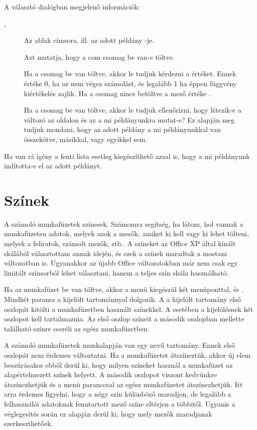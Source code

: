 A választó dialógban megjelenő információk:
\begin{description}
\item[, ] Az  ablak címsora, ill. az
adott  példány -je. 
\item[] Azt mutatja, hogy a com csomag be van-e töltve.
\item[] Ha a  csomag be van töltve, akkor le tudjuk
  kérdezni a  értéket. Ennek értéke 0, ha az
   nem végez 
  számolást, és legalább 1 ha éppen függvény kiértékelés zajlik. Ha a
   csomag nincs betöltve a mező értéke .  
\item[] Ha a 
  csomag be van töltve, akkor le tudjuk ellenőrizni, hogy létezik-e a
   változó az  oldalon és az a mi 
  példányunkra mutat-e? 
  Ez alapján meg tudjuk mondani, hogy az adott  példány a mi
  példányunkkal van összekötve, másikkal, vagy egyikkel sem.
\end{description}
Ha van rá igény a fenti lista esetleg kiegészíthető azzal is, hogy a
mi  példányunk indította-e el az adott  példányt.

\section{Színek}
\label{sec:3.3}

A számoló munkafüzetek színesek. Számomra segítség, ha látom, hol
vannak a munkafüzeten adatok, melyek azok a mezők, amiket ki kell vagy
ki lehet tölteni, melyek a feliratok, számolt mezők, stb.. 
A színeket az Office XP által kínált skálából választottam annak idején, és
ezek a színek maradtak a mostani változatban is. Ugyanakkor az újabb
Office változatokban már nem csak egy limitált színsorból lehet
választani, hanem a teljes szín skála használható. 

Ha az  munkafüzet be van töltve, akkor a 
  menü kiegészül két menüponttal,  és . Mindkét parancs a kijelölt tartománnyal dolgozik. A
 a kijelölt tartomány első oszlopát kitölti a
munkafüzetben használt színekkel. A 
 esetében a kijelölésnek két oszlopot kell
tartalmaznia. Az első oszlop színeit 
a második oszlopban mellette található színre cseréli az egész
munkafüzetben.

A számoló munkafüzetek  munkalapján van egy 
nevű tartomány. Ennek első oszlopát nem érdemes változtatni. Ha a
munkafüzetet átszíneztük, akkor új elem beszúrásakor ebből derül ki,
hogy milyen színeket használ a munkafüzet az alapértelmezett színek 
helyett. A második oszlopot viszont kedvünkre átszínezhetjük és a
 menü paranccsal az egész munkafüzetet
átszínezhetjük. Itt arra érdemes figyelni, hogy a négy szín 
különböző maradjon, de legalább a felhasználói adatoknak fenntartott
mező színe eltérjen 
a többitől. Ugyanis a véglegesítés során ez alapján derül ki, hogy
mely mezők maradjanak szerkeszthetőek.


